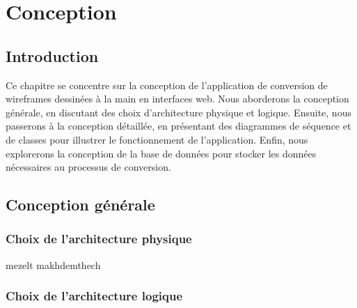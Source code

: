 \chapter{Conception}
\label{chap:conception}

\section{Introduction}

Ce chapitre se concentre sur la conception de l'application de conversion de wireframes dessinées à la main en interfaces web. Nous aborderons la conception générale, en discutant des choix d'architecture physique et logique. Ensuite, nous passerons à la conception détaillée, en présentant des diagrammes de séquence et de classes pour illustrer le fonctionnement de l'application. Enfin, nous explorerons la conception de la base de données pour stocker les données nécessaires au processus de conversion.

\section{Conception générale}

\subsection{Choix de l'architecture physique}

mezelt makhdemthech

\subsection{Choix de l'architecture logique}

